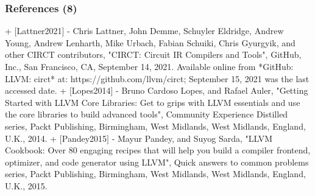 \begin{frame}
	\frametitle{References (8)}

+ $[$Lattner2021$]$
	- Chris Lattner, John Demme, Schuyler Eldridge, Andrew Young, Andrew Lenharth, Mike Urbach, Fabian Schuiki, Chris Gyurgyik, and {other CIRCT contributors}, "CIRCT: Circuit {IR} Compilers and Tools", {GitHub, Inc.}, San Francisco, {CA}, September 14, 2021. Available online from *{GitHub}: {LLVM}: circt* at: https://github.com/llvm/circt; September 15, 2021 was the last accessed date.
+ $[$Lopes2014$]$
	- Bruno Cardoso Lopes, and Rafael Auler, "Getting Started with {LLVM} Core Libraries: Get to grips with {LLVM} essentials and use the core libraries to build advanced tools", Community Experience Distilled series, Packt Publishing, Birmingham, West Midlands, West Midlands, England, {U.K.}, 2014.
+ $[$Pandey2015$]$
	- Mayur Pandey, and Suyog Sarda, "{LLVM} Cookbook: Over 80 engaging recipes that will help you build a compiler frontend, optimizer, and code generator using {LLVM}", Quick answers to common problems series, Packt Publishing, Birmingham, West Midlands, West Midlands, England, {U.K.}, 2015.


\end{frame}


















